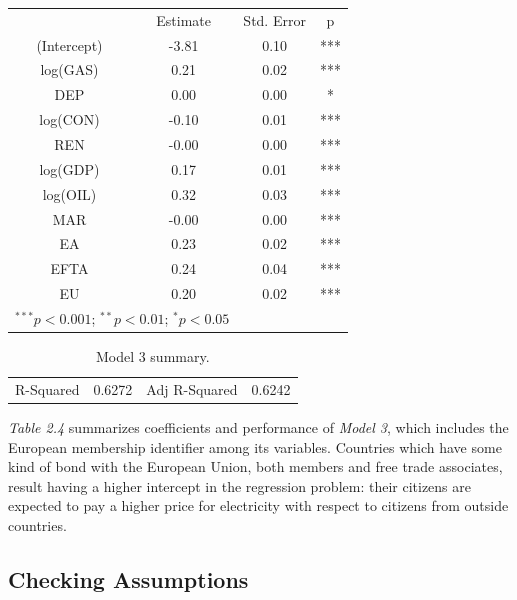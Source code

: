 \documentclass{book}
\begin{document}
\bigskip
\begin{table}[H]
\begin{center}
\begin{tabular}{|c|c|c|c|}
\hline
\rowcolor{lightgray} \multicolumn{4}{|c|}{Coefficients}\\
\hline
&Estimate&Std. Error&p\\
\hline
(Intercept)&-3.81&0.10&***\\
log(GAS)&0.21&0.02&***\\
DEP&0.00&0.00&*\\
log(CON)&-0.10&0.01&***\\
REN&-0.00&0.00&***\\
log(GDP)&0.17&0.01&***\\
log(OIL)&0.32&0.03&***\\
MAR&-0.00&0.00&***\\
EA&0.23&0.02&***\\
EFTA&0.24&0.04&***\\
EU&0.20&0.02&***\\
\hline
\multicolumn{2}{l}{\scriptsize{$^{***}p<0.001$; $^{**}p<0.01$; $^{*}p<0.05$}}
\end{tabular}
\end{center}
\end{table}
\begin{table}[H]
\begin{center}
\begin{tabular}{|c|c|c|c|}
\hline
\rowcolor{maroon} \multicolumn{4}{|c|}{Global Performance}\\
\hline
R-Squared&0.6272&Adj R-Squared&0.6242\\
\hline
\end{tabular}
\caption{Model 3 summary.}
\end{center}
\end{table}
\bigskip

\textit{Table 2.4} summarizes coefficients and performance of \textit{Model 3}, which includes the European membership identifier among its variables. Countries which have some kind of bond with the European Union, both members and free trade associates, result having a higher intercept in the regression problem: their citizens are expected to pay a higher price for electricity with respect to citizens from outside countries.

\subsection{Checking Assumptions}
\end{document}
